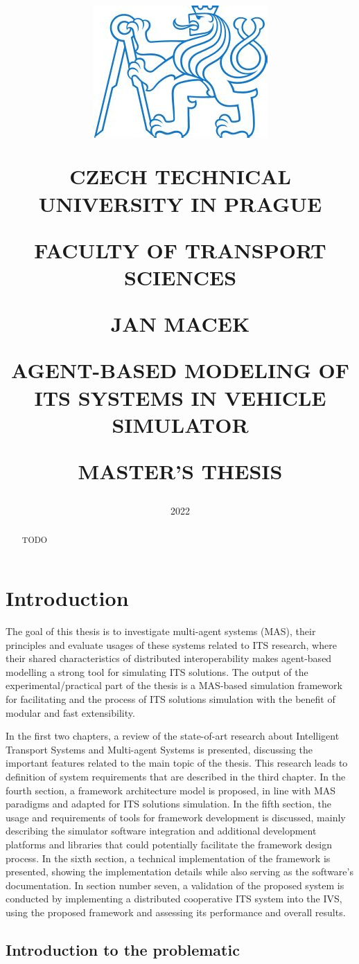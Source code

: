 \documentclass[titlepage, 12pt]{article}
\title{
\includegraphics[width=.3\textwidth]{cvut-logo.jpg}\par
\vspace{10mm}
\indent
\textbf{CZECH TECHNICAL UNIVERSITY IN PRAGUE}

FACULTY OF TRANSPORT SCIENCES

\vfill

{\Large JAN MACEK}
\vspace{10mm}

AGENT-BASED MODELING OF ITS SYSTEMS IN VEHICLE SIMULATOR 
\vspace{15mm}

{\Large MASTER'S THESIS}
\vfill

}
\date{\Large 2022}
\begin{document}
\setlength{\baselineskip}{1.5em}
\maketitle



\begin{abstract}
    TODO
\end{abstract}

\tableofcontents
\newpage

\section{Introduction}

The goal of this thesis is to investigate multi-agent systems (MAS), their 
principles and evaluate usages of these systems related to ITS research, where 
their shared characteristics of distributed interoperability makes
agent-based modelling a strong tool for simulating ITS solutions. The output of 
the experimental/practical part of the thesis is a MAS-based simulation framework 
for facilitating and the process of ITS solutions simulation with the benefit 
of modular and fast extensibility.

In the first two chapters, a review of the state-of-art research about Intelligent 
Transport Systems and Multi-agent Systems is presented, discussing the important 
features related to the main topic of the thesis. This research leads to definition of system
requirements that are described in the third chapter. In the 
fourth section, a framework architecture model is proposed, in line with 
MAS paradigms and adapted for ITS solutions simulation. In the fifth section, the
usage and requirements of tools for framework development is discussed, mainly describing the simulator software integration
and additional development platforms and libraries that could potentially facilitate the
framework design process. In the sixth section, a technical implementation of the 
framework is presented, showing the implementation details while also serving as the 
software's documentation. In section number seven, a validation of the proposed 
system is conducted by implementing a distributed cooperative ITS system into the
IVS, using the proposed framework and assessing its performance and overall results.

\subsection{Introduction to the problematic}
\end{document}
